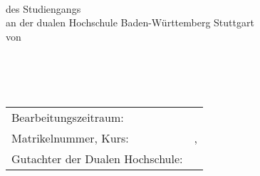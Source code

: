 \documentclass[main.tex]{subfiles}
\begin{document}
\begin{titlepage}
	\thispagestyle{firstPageStyle}
	\renewcommand{\baselinestretch}{1.0}
	\begin{center}
	        ~\\
	        \vspace{1cm}
		\large{{\titel}}\\
		\vspace{1cm}
		\large{\textbf{{\kind}}}\\
		\vspace{2cm}
		des Studiengangs {{\course}}\\
		an der dualen Hochschule Baden-Württemberg Stuttgart\\
		\vspace{1cm}
		von\\
		{{\Author}}\\
		\vspace{1.5cm}
		{{\duedate}}\\
		\vspace{2cm}
	\end{center}
	~
	\vspace{2cm}
	~
	\begingroup
	\centering
	\begin{tabular}{ll}
		Bearbeitungszeitraum:			& { {\bearbeitungszeit} }  \\ 
		Matrikelnummer, Kurs: 			& { {\matriculationno, \kurs}} \\ 
		Gutachter der Dualen Hochschule: 	& { {\supervisordhbw}} \\ [5ex]
	\end{tabular}
	\endgroup
	\vfill ~
\end{titlepage}
\end{document}
